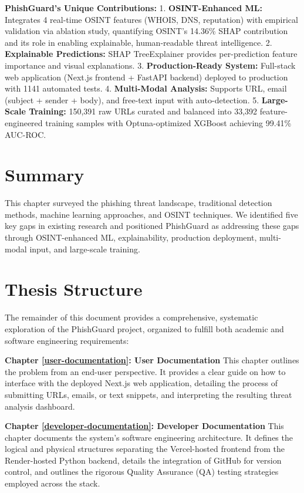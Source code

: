 \textbf{PhishGuard's Unique Contributions:} 1. \textbf{OSINT-Enhanced
ML:} Integrates 4 real-time OSINT features (WHOIS, DNS, reputation) with
empirical validation via ablation study, quantifying OSINT's 14.36\%
SHAP contribution and its role in enabling explainable, human-readable
threat intelligence. 2. \textbf{Explainable Predictions:} SHAP TreeExplainer provides
per-prediction feature importance and visual explanations. 3.
\textbf{Production-Ready System:} Full-stack web application (Next.js
 frontend + FastAPI backend) deployed to production with 1141 automated
 tests. 4. \textbf{Multi-Modal Analysis:} Supports URL, email (subject +
sender + body), and free-text input with auto-detection. 5.
\textbf{Large-Scale Training:} 150,391 raw URLs curated and balanced
into 33,392 feature-engineered training samples with
Optuna-optimized XGBoost achieving 99.41\% AUC-ROC.

\section{Summary}\label{summary}

This chapter surveyed the phishing threat landscape,
traditional detection methods, machine learning approaches, and OSINT techniques. We identified five
key gaps in existing research and positioned PhishGuard
as addressing these gaps through OSINT-enhanced ML, explainability,
production deployment, multi-modal input, and large-scale training.

\section{Thesis Structure}\label{thesis-structure}

The remainder of this document provides a comprehensive, systematic exploration of the PhishGuard project, organized to fulfill both academic and software engineering requirements:

\textbf{Chapter \ref{user-documentation}: User Documentation} This chapter outlines the problem from an end-user perspective. It provides a clear guide on how to interface with the deployed Next.js web application, detailing the process of submitting URLs, emails, or text snippets, and interpreting the resulting threat analysis dashboard.

\textbf{Chapter \ref{developer-documentation}: Developer Documentation} This chapter documents the system's software engineering architecture. It defines the logical and physical structures separating the Vercel-hosted frontend from the Render-hosted Python backend, details the integration of GitHub for version control, and outlines the rigorous Quality Assurance (QA) testing strategies employed across the stack.

